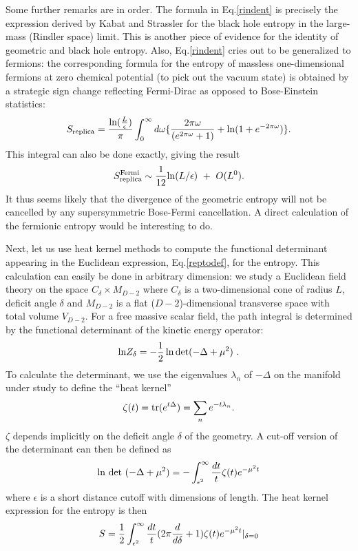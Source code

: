 \documentclass[12pt]{article}
\begin{document}
Some further remarks are in order. The formula in Eq.\ref{rindent} is precisely
the expression derived by Kabat and Strassler \cite{kabat} for the black hole
entropy in the large-mass (Rindler space) limit. This is another piece of
evidence for the identity of geometric and black hole entropy. Also,
Eq.\ref{rindent} cries out to be generalized to fermions: the corresponding
formula for the entropy of massless one-dimensional fermions at zero chemical
potential (to pick out the vacuum state) is obtained by a strategic sign
change reflecting Fermi-Dirac as opposed to Bose-Einstein statistics:
\begin{equation}
S_{\rm replica} = {{\rm ln}({L\over\epsilon})\over\pi}
\int_0^\infty d\omega \{
{2\pi\omega\over(e^{2\pi\omega}+1)}+{\rm ln}(1+e^{-2\pi\omega})\}.
\label{rindferment}
\end{equation}
This integral can also be done exactly, giving the result
\begin{equation}
	S_{\rm replica}^{\rm Fermi}\sim {1\over 12} {\rm ln}(L/\epsilon)~+~O(L^0).
\end{equation}
It thus seems likely that the divergence of the geometric entropy will not
be cancelled by any supersymmetric Bose-Fermi cancellation. A direct
calculation
of the fermionic entropy would be interesting to do.

Next, let us use heat kernel methods to compute the functional determinant
appearing in the Euclidean expression, Eq.\ref{reptodef}, for the entropy.
This calculation can easily be done in arbitrary dimension: we study
a Euclidean field theory on the space $C_\delta\times M_{D-2}$ where
$C_\delta$ is a two-dimensional cone of radius $L$, deficit angle
$\delta$ and $M_{D-2}$ is a flat ($D-2$)-dimensional transverse space with
total volume $V_{D-2}$. For a free massive scalar field, the path integral is
determined by the functional determinant of the kinetic energy operator:
\begin{equation}
{\rm ln} Z_\delta = -{1\over 2}\ln {\rm det}(-\Delta+\mu^2)~.
\end{equation}
To calculate the determinant, we use the eigenvalues $\lambda_n$ of
$-\Delta$ on the manifold under study to define the ``heat kernel''
\begin{equation}
\zeta(t)= \mathop{\rm tr}(e^{t\Delta})=\sum_n e^{-t\lambda_n}.
\end{equation}
$\zeta$ depends implicitly on the deficit angle $\delta$ of the geometry.
A cut-off version of the determinant can then be defined as
\begin{equation}
{\rm ln~det~}(-\Delta+\mu^2)=
-\int_{\epsilon^2}^\infty{dt\over t}\zeta(t)e^{-{\mu}^2 t}
\label{heatdet}
\end{equation}
where $\epsilon$ is a short distance cutoff with dimensions of length.
The heat kernel expression for the entropy is then
\begin{equation}
S = {1\over 2}\int_{\epsilon^2}^\infty{dt\over t}
(2\pi{d\over d\delta}+1) \zeta(t) e^{-{\mu}^2 t}|_{\delta=0}
\label{heatent}
\end{equation}
\end{document}
